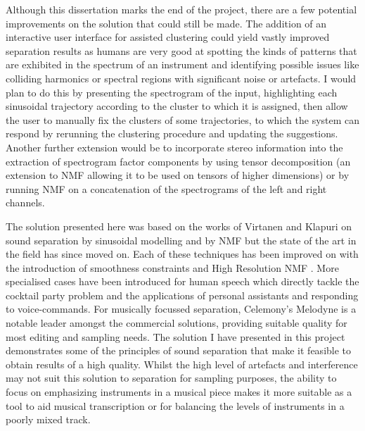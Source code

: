 \documentclass[12pt,a4paper,twoside,openright]{report}
\begin{document}
Although this dissertation marks the end of the project, there are a few potential improvements on the solution that could still be made. The addition of an interactive user interface for assisted clustering could yield vastly improved separation results as humans are very good at spotting the kinds of patterns that are exhibited in the spectrum of an instrument and identifying possible issues like colliding harmonics or spectral regions with significant noise or artefacts. I would plan to do this by presenting the spectrogram of the input, highlighting each sinusoidal trajectory according to the cluster to which it is assigned, then allow the user to manually fix the clusters of some trajectories, to which the system can respond by rerunning the clustering procedure and updating the suggestions. Another further extension would be to incorporate stereo information into the extraction of spectrogram factor components by using tensor decomposition (an extension to NMF allowing it to be used on tensors of higher dimensions) or by running NMF on a concatenation of the spectrograms of the left and right channels.


The solution presented here was based on the works of Virtanen and Klapuri \cite{virtanen2000separation} on sound separation by sinusoidal modelling and by NMF \cite{virtanen2003sound} but the state of the art in the field has since moved on. Each of these techniques has been improved on with the introduction of smoothness constraints \cite{virtanen2003algorithm} and High Resolution NMF \cite{badeau2011gaussian}. More specialised cases have been introduced for human speech \cite{schmidt2006single} which directly tackle the cocktail party problem and the applications of personal assistants and responding to voice-commands. For musically focussed separation, Celemony's Melodyne \cite{melodyne} is a notable leader amongst the commercial solutions, providing suitable quality for most editing and sampling needs. The solution I have presented in this project demonstrates some of the principles of sound separation that make it feasible to obtain results of a high quality. Whilst the high level of artefacts and interference may not suit this solution to separation for sampling purposes, the ability to focus on emphasizing instruments in a musical piece makes it more suitable as a tool to aid musical transcription or for balancing the levels of instruments in a poorly mixed track.

\end{document}
